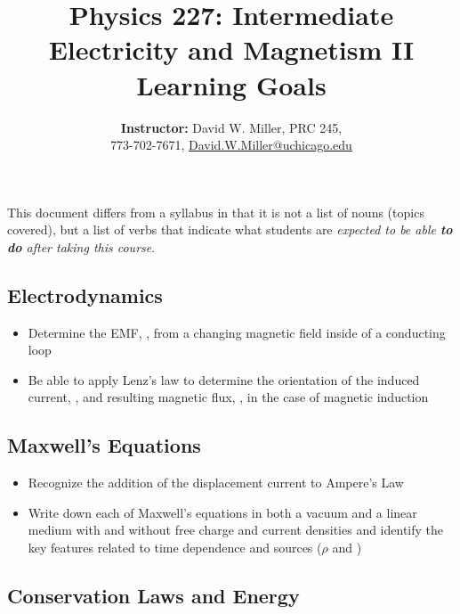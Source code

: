 \documentclass[12pt]{article}
\title{\sc Physics 227: Intermediate Electricity and Magnetism II\\Learning Goals}
\author{\textbf{Instructor:} David W. Miller, PRC 245, \\ 773-702-7671, \href{mailto:David.W.Miller@uchicago.edu}{David.W.Miller@uchicago.edu}}
\date{}
\begin{document}
\maketitle

\thispagestyle{fancy}


\noindent This document differs from a syllabus in that it is not a list of nouns (topics covered), but a list of verbs that indicate what students are \textit{expected to be able \textbf{to do} after taking this course}.

\subsection*{Electrodynamics}

\begin{itemize}
  \item Determine the EMF, \EMF, from a changing magnetic field inside of a conducting loop
  \item Be able to apply Lenz's law to determine the orientation of the induced current, \Ivec, and resulting magnetic flux, \Flux, in the case of magnetic induction
\end{itemize}

\subsection*{Maxwell's Equations}

\begin{itemize}
  \item Recognize the addition of the displacement current to Ampere's Law
  \item Write down each of Maxwell's equations in both a vacuum and a linear medium with and without free charge and current densities and identify the key features related to time dependence and sources ($\rho$ and \Jvec)
\end{itemize}

\subsection*{Conservation Laws and Energy}
\end{document}
